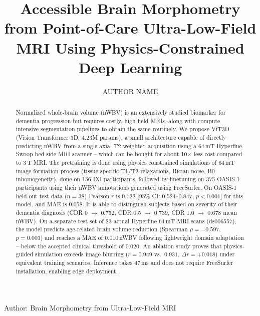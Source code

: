 \documentclass{ieeeaccess}
\begin{document}

\title{Accessible Brain Morphometry from Point-of-Care
Ultra-Low-Field MRI Using Physics-Constrained Deep Learning}

\author{%
  \uppercase{Author Name}%
}

\address[1]{Department Name, Institution Name,
City, Country (e-mail: author@institution.edu)}


         {Author: Brain Morphometry from Ultra-Low-Field MRI}


\begin{abstract}
Normalized whole-brain volume (nWBV) is an extensively studied biomarker for
dementia progression but requires costly, high field MRIs, along with compute
intensive segmentation pipelines to obtain the same routinely. We propose
ViT3D (Vision Transformer 3D, 4.23M params), a small architecture capable of
directly predicting nWBV from a single axial T2 weighted acquisition using a
64\,mT Hyperfine Swoop bed-side MRI scanner -- which can be bought for about
10$\times$ less cost compared to 3\,T MRI. The pretraining is done using
physics constrained simulations of 64\,mT image formation process (tissue
specific T1/T2 relaxations, Rician noise, B0 inhomogeneity), done on 156 IXI
participants, followed by finetuning on 375 OASIS-1 participants using their
nWBV annotations generated using FreeSurfer. On OASIS-1 held-out test data
($n = 38$) Pearson $r$ is 0.722 [95\% CI: 0.524--0.847, $p < 0.001$] for
this model, and MAE is 0.058. It is able to distinguish subjects based on
severity of their dementia diagnosis (CDR 0 $\to$ 0.752, CDR 0.5 $\to$
0.739, CDR 1.0 $\to$ 0.678 mean nWBV). On a separate test set of 23 actual
Hyperfine 64\,mT MRI scans (ds006557), the model predicts age-related brain
volume reduction (Spearman $\rho = -0.597$, $p = 0.003$) and reaches a MAE
of 0.010\,nWBV following lightweight domain adaptation -- below the accepted
clinical threshold of 0.020. An ablation study proves that physics-guided
simulation exceeds image blurring ($r = 0.949$ vs.\ $0.931$, $\Delta r =
+0.018$) under equivalent training scenarios. Inference takes 47\,ms and
does not require FreeSurfer installation, enabling edge deployment.
\end{abstract}
\end{document}

